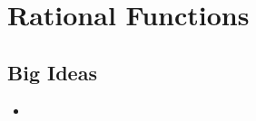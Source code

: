 \chapter{Rational Functions}
\label{chap:RF}

\section{Big Ideas}
\label{sec:RF Big Ideas}
\begin{itemize}
  \item 
\end{itemize}